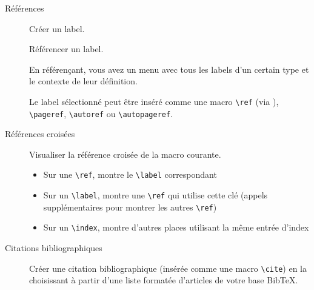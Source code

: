 \documentclass[t]{beamer}
\let\ORIkeys\keys
\renewcommand{\keys}[1]{\ORIkeys{\texttt{#1}}}
\newcommand{\repeatedkeys}[1]{\keys{\textcolor{gray}{#1}}}
\begin{document}
\begin{frame}[fragile,label={sec:orgc159184}]{Références}
 \begin{description}
\item[{\keys{C-c} \keys{(}}] Créer un label.

\item[{\repeatedkeys{C-c} \keys{)}}] Référencer un label.

En référençant, vous avez un menu avec tous les labels d'un certain type
et le contexte de leur définition.

Le label sélectionné peut être inséré comme une macro \texttt{\textbackslash{}ref} (via
\keys{C-m}), \texttt{\textbackslash{}pageref}, \texttt{\textbackslash{}autoref} ou \texttt{\textbackslash{}autopageref}.
\end{description}
\end{frame}

\begin{frame}[fragile,label={sec:org0ea7925}]{Références croisées}
 \begin{description}
\item[{\keys{C-c} \keys{\&}}] Visualiser la référence croisée de la macro courante.

\begin{itemize}
\item Sur une \texttt{\textbackslash{}ref}, montre le \texttt{\textbackslash{}label} correspondant
\item Sur un \texttt{\textbackslash{}label}, montre une \texttt{\textbackslash{}ref} qui utilise cette clé (appels
supplémentaires pour montrer les autres \texttt{\textbackslash{}ref})
\end{itemize}

\begin{itemize}
\item Sur un \texttt{\textbackslash{}index}, montre d'autres places utilisant la même entrée d'index
\end{itemize}
\end{description}
\end{frame}

\begin{frame}[fragile,label={sec:org5984e95}]{Citations bibliographiques}
 \begin{description}
\item[{\keys{C-c} \keys{[} \keys{REGEXP}}] Créer une citation bibliographique (insérée comme une macro \texttt{\textbackslash{}cite}) en la
choisissant à partir d'une liste \alert{formatée} d'articles de votre base
BibTeX.
\end{description}
\end{frame}
\end{document}
